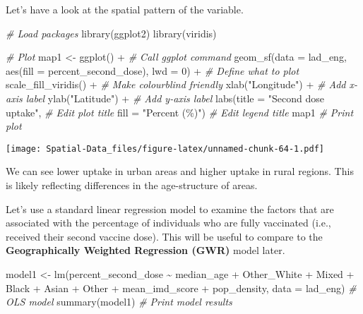 \documentclass[
]{book}
\newenvironment{Shaded}{\begin{snugshade}}{\end{snugshade}}
\newcommand{\AttributeTok}[1]{\textcolor[rgb]{0.77,0.63,0.00}{#1}}
\newcommand{\CommentTok}[1]{\textcolor[rgb]{0.56,0.35,0.01}{\textit{#1}}}
\newcommand{\DecValTok}[1]{\textcolor[rgb]{0.00,0.00,0.81}{#1}}
\newcommand{\FunctionTok}[1]{\textcolor[rgb]{0.00,0.00,0.00}{#1}}
\newcommand{\NormalTok}[1]{#1}
\newcommand{\OtherTok}[1]{\textcolor[rgb]{0.56,0.35,0.01}{#1}}
\newcommand{\SpecialCharTok}[1]{\textcolor[rgb]{0.00,0.00,0.00}{#1}}
\newcommand{\StringTok}[1]{\textcolor[rgb]{0.31,0.60,0.02}{#1}}
\begin{document}
Let's have a look at the spatial pattern of the variable.

\begin{Shaded}
\begin{Highlighting}[]
\CommentTok{\# Load packages}
\FunctionTok{library}\NormalTok{(ggplot2) }
\FunctionTok{library}\NormalTok{(viridis)}

\CommentTok{\# Plot}
\NormalTok{map1 }\OtherTok{\textless{}{-}} \FunctionTok{ggplot}\NormalTok{() }\SpecialCharTok{+} \CommentTok{\# Call ggplot command}
  \FunctionTok{geom\_sf}\NormalTok{(}\AttributeTok{data =}\NormalTok{ lad\_eng, }\FunctionTok{aes}\NormalTok{(}\AttributeTok{fill =}\NormalTok{ percent\_second\_dose), }\AttributeTok{lwd =} \DecValTok{0}\NormalTok{) }\SpecialCharTok{+} \CommentTok{\# Define what to plot}
  \FunctionTok{scale\_fill\_viridis}\NormalTok{() }\SpecialCharTok{+} \CommentTok{\# Make colourblind friendly}
  \FunctionTok{xlab}\NormalTok{(}\StringTok{"Longitude"}\NormalTok{) }\SpecialCharTok{+} \CommentTok{\# Add x{-}axis label}
  \FunctionTok{ylab}\NormalTok{(}\StringTok{"Latitude"}\NormalTok{) }\SpecialCharTok{+} \CommentTok{\# Add y{-}axis label}
  \FunctionTok{labs}\NormalTok{(}\AttributeTok{title =} \StringTok{"Second dose uptake"}\NormalTok{, }\CommentTok{\# Edit plot title}
       \AttributeTok{fill =} \StringTok{"Percent (\%)"}\NormalTok{) }\CommentTok{\# Edit legend title}
\NormalTok{map1 }\CommentTok{\# Print plot}
\end{Highlighting}
\end{Shaded}

\texttt{[image: Spatial-Data\_files/figure-latex/unnamed-chunk-64-1.pdf]}

We can see lower uptake in urban areas and higher uptake in rural regions. This is likely reflecting differences in the age-structure of areas.

Let's use a standard linear regression model to examine the factors that are associated with the percentage of individuals who are fully vaccinated (i.e., received their second vaccine dose). This will be useful to compare to the \textbf{Geographically Weighted Regression (GWR)} model later.

\begin{Shaded}
\begin{Highlighting}[]
\NormalTok{model1 }\OtherTok{\textless{}{-}} \FunctionTok{lm}\NormalTok{(percent\_second\_dose }\SpecialCharTok{\textasciitilde{}}\NormalTok{ median\_age }\SpecialCharTok{+}\NormalTok{ Other\_White }\SpecialCharTok{+}\NormalTok{ Mixed }\SpecialCharTok{+}\NormalTok{ Black }\SpecialCharTok{+}\NormalTok{ Asian }\SpecialCharTok{+}\NormalTok{ Other }\SpecialCharTok{+}\NormalTok{ mean\_imd\_score }\SpecialCharTok{+}\NormalTok{ pop\_density, }\AttributeTok{data =}\NormalTok{ lad\_eng) }\CommentTok{\# OLS model}
\FunctionTok{summary}\NormalTok{(model1) }\CommentTok{\# Print model results}
\end{Highlighting}
\end{Shaded}
\end{document}
